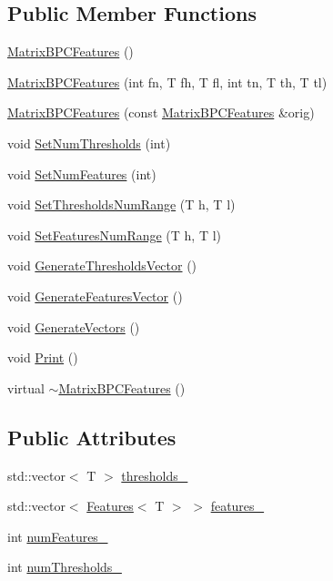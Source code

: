 \subsection*{Public Member Functions}
\begin{DoxyCompactItemize}
\item 
\hyperlink{classMatrixBPCFeatures_a72c1b182fac4397958ab20e37b58921e}{Matrix\+B\+P\+C\+Features} ()
\item 
\hyperlink{classMatrixBPCFeatures_afd6954e98b99e3ab09ad81082b9095d6}{Matrix\+B\+P\+C\+Features} (int fn, T fh, T fl, int tn, T th, T tl)
\item 
\hyperlink{classMatrixBPCFeatures_ad2bcf448da611be1417c6284b26b28ba}{Matrix\+B\+P\+C\+Features} (const \hyperlink{classMatrixBPCFeatures}{Matrix\+B\+P\+C\+Features} \&orig)
\item 
void \hyperlink{classMatrixBPCFeatures_ab26e57f5800162202aeaa38b719e9737}{Set\+Num\+Thresholds} (int)
\item 
void \hyperlink{classMatrixBPCFeatures_afd55350772c55d9608b8203734573b95}{Set\+Num\+Features} (int)
\item 
void \hyperlink{classMatrixBPCFeatures_a877df38950e5b68116e7ee8cdce764b2}{Set\+Thresholds\+Num\+Range} (T h, T l)
\item 
void \hyperlink{classMatrixBPCFeatures_a318a3a2a849eeb7e90b0be2454a61f61}{Set\+Features\+Num\+Range} (T h, T l)
\item 
void \hyperlink{classMatrixBPCFeatures_a912356bafe600e5625e21513d6f6ff71}{Generate\+Thresholds\+Vector} ()
\item 
void \hyperlink{classMatrixBPCFeatures_a25ae483a38966da88fd505f0536aa693}{Generate\+Features\+Vector} ()
\item 
void \hyperlink{classMatrixBPCFeatures_a710350735d6a54c8f936c9a3cb63db65}{Generate\+Vectors} ()
\item 
void \hyperlink{classMatrixBPCFeatures_a71ae3c997966a51917be4ca2f62f2e3e}{Print} ()
\item 
virtual \hyperlink{classMatrixBPCFeatures_a9d32e56c43b148b02ba325fd95479a1e}{$\sim$\+Matrix\+B\+P\+C\+Features} ()
\end{DoxyCompactItemize}
\subsection*{Public Attributes}
\begin{DoxyCompactItemize}
\item 
std\+::vector$<$ T $>$ \hyperlink{classMatrixBPCFeatures_a34418b525a7ceb5b2ec203415c46f066}{thresholds\+\_\+}
\item 
std\+::vector$<$ \hyperlink{MatrixBPCFeatures_8h_ab023c08b6db726ae7e0acc935755cfe6}{Features}$<$ T $>$ $>$ \hyperlink{classMatrixBPCFeatures_ad6ce34b650ac55b5d857a322cb239132}{features\+\_\+}
\item 
int \hyperlink{classMatrixBPCFeatures_ad3a5bf17a1666bbecf520f68d109b460}{num\+Features\+\_\+}
\item 
int \hyperlink{classMatrixBPCFeatures_adcdf00f112691ab61c3d305a3a9cbe89}{num\+Thresholds\+\_\+}
\end{DoxyCompactItemize}
